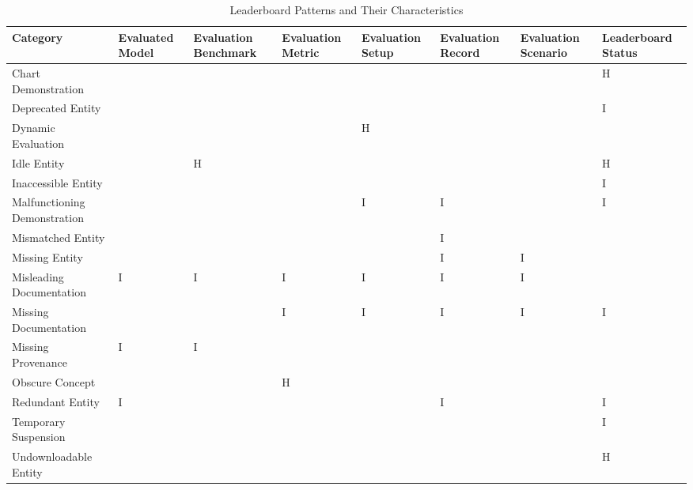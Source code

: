 \begin{table}
\caption{Leaderboard Patterns and Their Characteristics}
\label{tab:pattern}
\begin{tabular}{llllllll}
\toprule
Category & Evaluated Model & Evaluation Benchmark & Evaluation Metric & Evaluation Setup & Evaluation Record & Evaluation Scenario & Leaderboard Status \\
\midrule
Chart Demonstration &  &  &  &  &  &  & H \\
Deprecated Entity &  &  &  &  &  &  & I \\
Dynamic Evaluation &  &  &  & H &  &  &  \\
Idle Entity &  & H &  &  &  &  & H \\
Inaccessible Entity &  &  &  &  &  &  & I \\
Malfunctioning Demonstration &  &  &  & I & I &  & I \\
Mismatched Entity &  &  &  &  & I &  &  \\
Missing Entity &  &  &  &  & I & I &  \\
Misleading Documentation & I & I & I & I & I & I &  \\
Missing Documentation &  &  & I & I & I & I & I \\
Missing Provenance & I & I &  &  &  &  &  \\
Obscure Concept &  &  & H &  &  &  &  \\
Redundant Entity & I &  &  &  & I &  & I \\
Temporary Suspension &  &  &  &  &  &  & I \\
Undownloadable Entity &  &  &  &  &  &  & H \\
\bottomrule
\end{tabular}
\end{table}
